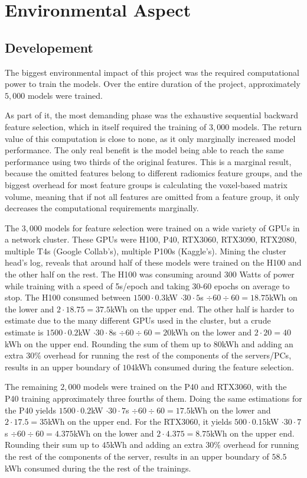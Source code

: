 \section{Environmental Aspect}

\subsection{Developement}

The biggest environmental impact of this project was the required computational power to train the models. Over the entire duration of the project, approximately $5,000$ models were trained.\par
As part of it, the most demanding phase was the exhaustive sequential backward feature selection, which in itself required the training of $3,000$ models. The return value of this computation is close to none, as it only marginally increased model performance. The only real benefit is the model being able to reach the same performance using two thirds of the original features. This is a marginal result, because the omitted features belong to different radiomics feature groups, and the biggest overhead for most feature groups is calculating the voxel-based matrix volume, meaning that if not all features are omitted from a feature group, it only decreases the computational requirements marginally.\par
The $3,000$ models for feature selection were trained on a wide variety of GPUs in a network cluster. These GPUs were H100, P40, RTX3060, RTX3090, RTX2080, multiple T4s (Google Collab's), multiple P100s (Kaggle's). Mining the cluster head's log, reveals that around half of these models were trained on the H100 and the other half on the rest. The H100 was consuming around 300 Watts of power while training with a speed of 5s/epoch and taking 30-60 epochs on average to stop. The H100 consumed between $1500 \cdot 0.3$kW $ \cdot 30 \cdot 5$s $ \div 60 \div 60 = 18.75$kWh on the lower and $2 \cdot 18.75 = 37.5$kWh on the upper end. The other half is harder to estimate due to the many different GPUs used in the cluster, but a crude estimate is $1500 \cdot 0.2$kW $ \cdot 30 \cdot 8$s $ \div 60 \div 60 = 20$kWh on the lower and $2 \cdot 20 = 40$kWh on the upper end. Rounding the sum of them up to $80$kWh and adding an extra $30\%$ overhead for running the rest of the components of the servers/PCs, results in an upper boundary of $104$kWh consumed during the feature selection.\par
The remaining $2,000$ models were trained on the P40 and RTX3060, with the P40 training approximately three fourths of them. Doing the same estimations for the P40 yields $1500 \cdot 0.2$kW $ \cdot 30 \cdot 7$s $ \div 60 \div 60 = 17.5$kWh on the lower and $2 \cdot 17.5 = 35$kWh on the upper end. For the RTX3060, it yields $500 \cdot 0.15$kW $ \cdot 30 \cdot 7$s $ \div 60 \div 60 = 4.375$kWh on the lower and $2 \cdot 4.375 = 8.75$kWh on the upper end. Rounding their sum up to $45$kWh and adding an extra $30\%$ overhead for running the rest of the components of the server, results in an upper boundary of $58.5$kWh consumed during the the rest of the trainings.\par
